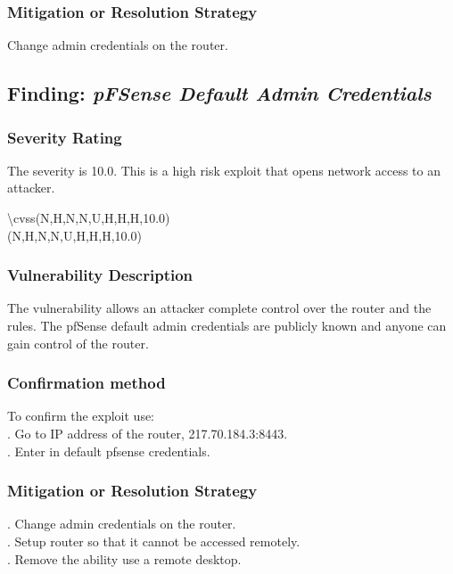 \documentclass[notitlepage]{article}
\begin{document}
	\subsubsection{Mitigation or Resolution Strategy}
	\indent Change admin credentials on the router.  \\
	
	\subsection{Finding: \emph{pFSense Default Admin Credentials}}
	
	\subsubsection{Severity Rating}
	\indent The severity is 10.0. This is a high risk exploit that opens network access to an attacker. 
	
	\textbackslash cvss(N,H,N,N,U,H,H,H,10.0)\\
	\cvss(N,H,N,N,U,H,H,H,10.0) \\
	
	\subsubsection{Vulnerability Description}
	\indent The vulnerability allows an attacker complete control over the router and the rules.  The pfSense default admin credentials are publicly known and anyone can gain control of the router.
	
	\subsubsection{Confirmation method}
	To confirm the exploit use: \\
	. Go to IP address of the router, 217.70.184.3:8443.\\
	. Enter in default pfsense credentials.\\
	
	\subsubsection{Mitigation or Resolution Strategy}
	. Change admin credentials on the router.  \\
	. Setup router so that it cannot be accessed remotely. \\
	. Remove the ability use a remote desktop. \\
	
\end{document}
